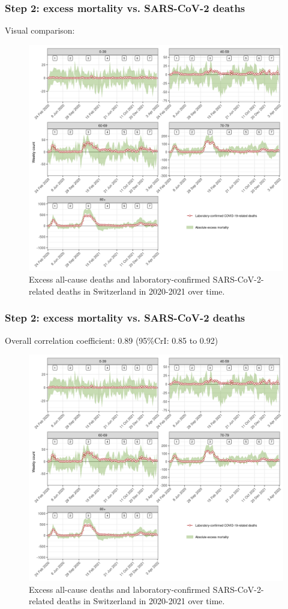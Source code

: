 \documentclass[10pt]{beamer}
\begin{document}
\begin{frame}
\frametitle{Step 2: excess mortality vs. SARS-CoV-2 deaths}
\alert{Visual comparison}:
\begin{figure}[t]
	\includegraphics[width=.8\linewidth ]{figures/fig2.png}
	\caption{Excess all-cause deaths and laboratory-confirmed SARS-CoV-2-related deaths in Switzerland in 2020-2021 over time.}
	
\end{figure}
\end{frame}

\begin{frame}
	\frametitle{Step 2: excess mortality vs. SARS-CoV-2 deaths}
	Overall correlation coefficient: \alert{0.89} (95\%CrI: 0.85 to 0.92)
	\begin{figure}[t]
		\includegraphics[width=.8\linewidth ]{figures/fig2.png}
		\caption{Excess all-cause deaths and laboratory-confirmed SARS-CoV-2-related deaths in Switzerland in 2020-2021 over time.}
		
	\end{figure}
\end{frame}
\end{document}
